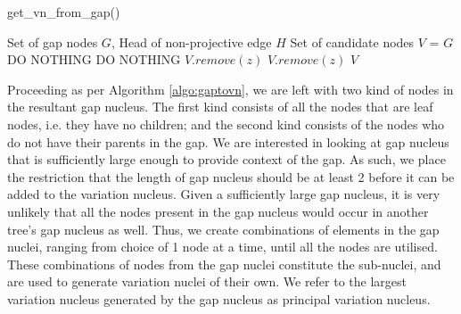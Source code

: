 \begin{algorithm}[H]
\caption{get\_vn\_from\_gap()}
\label{algo:gaptovn}
    \begin{algorithmic}[1]
    \REQUIRE Set of gap nodes $G$, Head of non-projective edge $H$
    \STATE Set of candidate nodes $V$ = $G$
        \STATE DO NOTHING
                \STATE DO NOTHING
            \ELSE
                \STATE $V.remove(z)$
            \ENDIF
        \ENDFOR
    \ELSE
                \STATE $V.remove(z)$
            \ENDIF
        \ENDFOR
    \ENDIF
    \ENDFOR
    \RETURN $V$
    \end{algorithmic}
\end{algorithm}

Proceeding as per Algorithm \ref{algo:gaptovn}, we are left with two kind of nodes in the resultant gap nucleus. The first kind consists of all the nodes that are leaf nodes, i.e. they have no children; and the second kind consists of the nodes who do not have their parents in the gap. We are interested in looking at gap nucleus that is sufficiently large enough to provide context of the gap. As such, we place the restriction that the length of gap nucleus should be at least 2 before it can be added to the variation nucleus. Given a sufficiently large gap nucleus, it is very unlikely that all the nodes present in the gap nucleus would occur in another tree's gap nucleus as well. Thus, we create combinations of elements in the gap nuclei, ranging from choice of 1 node at a time, until all the nodes are utilised. These combinations of nodes from the gap nuclei constitute the sub-nuclei, and are used to generate variation nuclei of their own. We refer to the largest variation nucleus generated by the gap nucleus as principal variation nucleus.

